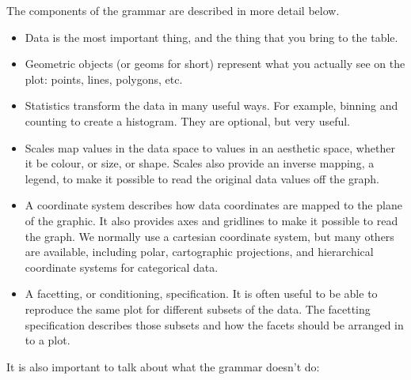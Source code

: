 The components of the grammar are described in more detail below.

\begin{itemize}
	\item Data is the most important thing, and the thing that you bring to the table.
	\item Geometric objects (or geoms for short) represent what you actually see on the plot: points, lines, polygons, etc.
	\item Statistics transform the data in many useful ways.  For example, binning and counting to create a histogram.  They are optional, but very useful.
	\item Scales map values in the data space to values in an aesthetic space, whether it be colour, or size, or shape.  Scales also provide an inverse mapping, a legend, to make it possible to read the original data values off the graph.
	\item A coordinate system describes how data coordinates are mapped to the plane of the graphic.  It also provides axes and gridlines to make it possible to read the graph.  We normally use a cartesian coordinate system, but many others are available, including polar, cartographic projections, and hierarchical coordinate systems for categorical data.
	\item A facetting, or conditioning, specification.  It is often useful to be able to reproduce the same plot for different subsets of the data.  The facetting specification describes those subsets and how the facets should be arranged in to a plot.
\end{itemize}

It is also important to talk about what the grammar doesn't do:


